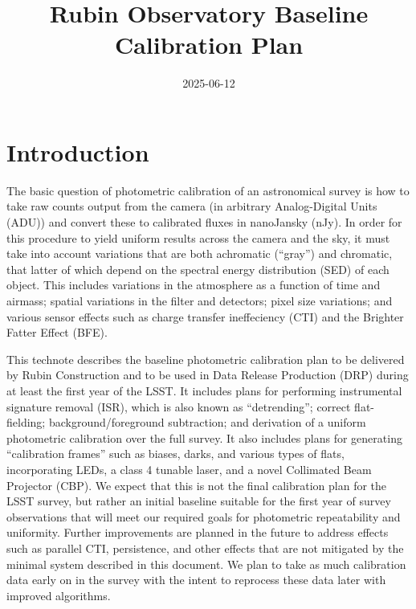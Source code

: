 \documentclass[SE,authoryear,lsstdraft,toc]{lsstdoc}
\title{Rubin Observatory Baseline Calibration Plan}
\date{2025-06-12}
\begin{document}
\maketitle


\section{Introduction}

The basic question of photometric calibration of an astronomical survey is how
to take raw counts output from the camera (in arbitrary Analog-Digital Units
(ADU)) and convert these to calibrated fluxes in nanoJansky (nJy).  In order
for this procedure to yield uniform results across the camera and the sky, it
must take into account variations that are both achromatic (``gray'') and
chromatic, that latter of which depend on the spectral energy distribution (SED) of each
object.  This includes variations in the atmosphere as a function of time and
airmass; spatial variations in the filter and detectors; pixel size variations;
and various sensor effects such as charge transfer ineffeciency (CTI) and the
Brighter Fatter Effect (BFE).

This technote describes the baseline photometric calibration plan to be
delivered by Rubin Construction and to be used in Data Release Production (DRP)
during at least the first year of the LSST.  It includes plans for performing
instrumental signature removal (ISR), which is also known as ``detrending'';
correct flat-fielding; background/foreground subtraction; and derivation of a
uniform photometric calibration over the full survey.  It also includes plans
for generating ``calibration frames'' such as biases, darks, and various types
of flats, incorporating LEDs, a class 4 tunable laser, and a novel Collimated
Beam Projector (CBP).  We expect that this is not the final calibration plan
for the LSST survey, but rather an initial baseline suitable for the first year
of survey observations that will meet our required goals for photometric
repeatability and uniformity.  Further improvements are planned in the future
to address effects such as parallel CTI, persistence, and other effects that
are not mitigated by the minimal system described in this document. We plan to
take as much calibration data early on in the survey with the intent to
reprocess these data later with improved algorithms.
\end{document}
